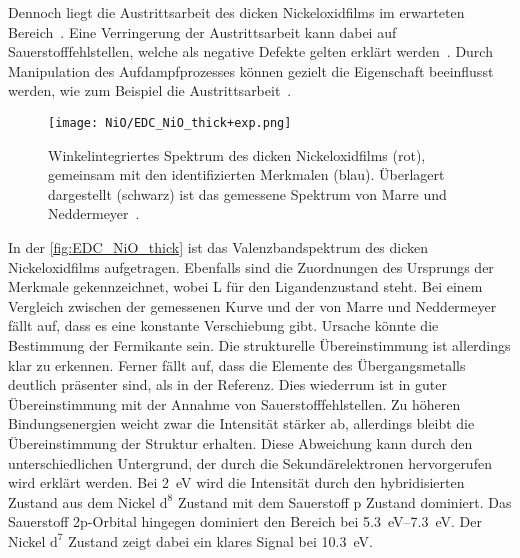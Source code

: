         Dennoch liegt die Austrittsarbeit des dicken Nickeloxidfilms im erwarteten Bereich~\cite{poulain_electronic_2020}.
        Eine Verringerung der Austrittsarbeit kann dabei auf Sauerstofffehlstellen, welche als negative Defekte gelten erklärt werden~\cite{IF_3}.
        Durch Manipulation des Aufdampfprozesses können gezielt die Eigenschaft beeinflusst werden, wie zum Beispiel die Austrittsarbeit~\cite{poulain_electronic_2020}.

        \begin{figure}
            \centering
            \texttt{[image: NiO/EDC\_NiO\_thick+exp.png]}
            \caption{Winkelintegriertes Spektrum des dicken Nickeloxidfilms (rot), gemeinsam mit den identifizierten Merkmalen (blau).
            Überlagert dargestellt (schwarz) ist das gemessene Spektrum von Marre und Neddermeyer~\cite{NiO_7}.} 
            \label{fig:EDC_NiO_thick}
        \end{figure}
        In der \autoref{fig:EDC_NiO_thick} ist das Valenzbandspektrum des dicken Nickeloxidfilms aufgetragen.
        Ebenfalls sind die Zuordnungen des Ursprungs der Merkmale gekennzeichnet, wobei L für den Ligandenzustand steht.
        Bei einem Vergleich zwischen der gemessenen Kurve und der von Marre und Neddermeyer~\cite{NiO_7} fällt auf, dass es eine konstante Verschiebung gibt.
        Ursache könnte die Bestimmung der Fermikante sein. %
        Die strukturelle Übereinstimmung ist allerdings klar zu erkennen. 
        Ferner fällt auf, dass die Elemente des Übergangsmetalls deutlich präsenter sind, als in der Referenz.
        Dies wiederrum ist in guter Übereinstimmung mit der Annahme von Sauerstofffehlstellen.
        Zu höheren Bindungsenergien weicht zwar die Intensität stärker ab, allerdings bleibt die Übereinstimmung der Struktur erhalten.
        Diese Abweichung kann durch den unterschiedlichen Untergrund, der durch die Sekundärelektronen hervorgerufen wird erklärt werden.
        Bei \SI{2}{\electronvolt} wird die Intensität durch den hybridisierten Zustand aus dem Nickel $\text{d}^8$ Zustand mit dem Sauerstoff p Zustand dominiert.
        Das Sauerstoff 2p-Orbital hingegen dominiert den Bereich bei \SIrange[range-phrase=\:und\:]{5.3}{7.3}{\electronvolt}.
        Der Nickel $\text{d}^7$ Zustand zeigt dabei ein klares Signal bei \SI{10.3}{\electronvolt}.

